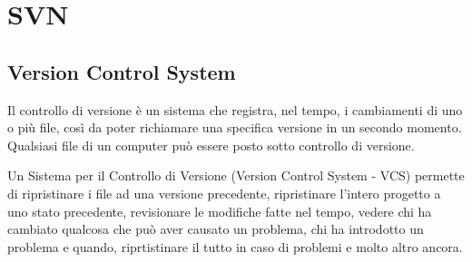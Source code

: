 \chapter{SVN}


\section{Version Control System}
Il controllo di versione è un sistema che registra, nel tempo, i cambiamenti di uno o più file, così da poter richiamare una specifica versione in un secondo momento. Qualsiasi file di un computer può essere posto sotto controllo di versione.

Un Sistema per il Controllo di Versione (Version Control System - VCS)  permette di ripristinare i file ad una versione precedente, ripristinare l'intero progetto a uno stato precedente, revisionare le modifiche fatte nel tempo, vedere chi ha cambiato qualcosa che può aver causato un problema, chi ha introdotto un problema e quando, riprtistinare il tutto in caso di problemi e molto altro ancora. 


